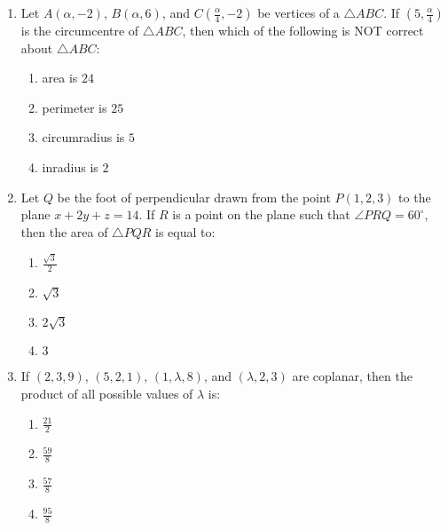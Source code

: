 \documentclass[journal]{IEEEtran}
\newcommand{\brak}[1]{\left( #1 \right)}
\begin{document}
\begin{enumerate}
    \item Let $A\brak{\alpha,-2}$, $B\brak{\alpha,6}$, and $C\brak{\frac{\alpha}{4},-2}$ be vertices of a $\triangle ABC$. If $\brak{5,\frac{\alpha}{4}}$ is the circumcentre of $\triangle ABC$, then which of the following is NOT correct about $\triangle ABC$:

        \begin{multicols}{4}
        \begin{enumerate}
        \item area is $24$
        \item perimeter is $25$
        \item circumradius is $5$
        \item inradius is $2$
        \end{enumerate}
        \end{multicols}

    \item Let $Q$ be the foot of perpendicular drawn from the point $P\brak{1,2,3}$ to the plane $x+2y+z=14$. If $R$ is a point on the plane such that $\angle PRQ=60^{\circ}$, then the area of $\triangle PQR$ is equal to:

        \begin{multicols}{4}
        \begin{enumerate}
        \item $\frac{\sqrt{3}}{2}$
        \item $\sqrt{3}$
        \item $2\sqrt{3}$
        \item $3$
        \end{enumerate}
        \end{multicols}
                
    \item If $\brak{2,3,9}$, $\brak{5,2,1}$, $\brak{1,\lambda,8}$, and $\brak{\lambda,2,3}$ are coplanar, then the product of all possible values of $\lambda$ is:

        \begin{multicols}{4}
        \begin{enumerate}
        \item $\frac{21}{2}$
        \item $\frac{59}{8}$
        \item $\frac{57}{8}$
        \item $\frac{95}{8}$
        \end{enumerate}
        \end{multicols}
        
\end{enumerate}
\end{document}
